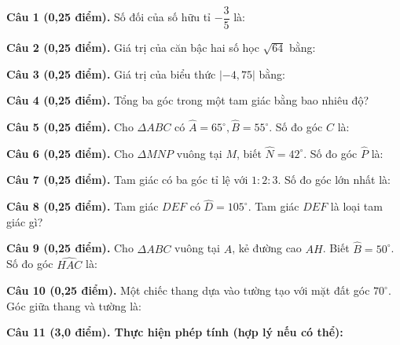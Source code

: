 \documentclass[12pt,a4paper]{article}
\begin{document}
\vspace{1.5mm}
\noindent\textbf{Câu 1 (0,25 điểm).} Số đối của số hữu tỉ $-\dfrac{3}{5}$ là: \par\vspace{2.3mm}
\noindent\textbf{Câu 2 (0,25 điểm).} Giá trị của căn bậc hai số học $\sqrt{64}$ bằng: \par\vspace{2.3mm}
\noindent\textbf{Câu 3 (0,25 điểm).} Giá trị của biểu thức $|-4{,}75|$ bằng: \par\vspace{2.3mm}
\noindent\textbf{Câu 4 (0,25 điểm).} Tổng ba góc trong một tam giác bằng bao nhiêu độ? \par\vspace{2.3mm}
\noindent\textbf{Câu 5 (0,25 điểm).} Cho $\Delta ABC$ có $\widehat{A} = 65^\circ, \widehat{B} = 55^\circ$. Số đo góc $\widehat{C}$ là: \par\vspace{2.3mm}
\noindent\textbf{Câu 6 (0,25 điểm).} Cho $\Delta MNP$ vuông tại $M$, biết $\widehat{N} = 42^\circ$. Số đo góc $\widehat{P}$ là: \par\vspace{2.3mm}
\noindent\textbf{Câu 7 (0,25 điểm).} Tam giác có ba góc tỉ lệ với $1 : 2 : 3$. Số đo góc lớn nhất là: \par\vspace{2.3mm}
\noindent\textbf{Câu 8 (0,25 điểm).} Tam giác $DEF$ có $\widehat{D} = 105^\circ$. Tam giác $DEF$ là loại tam giác gì? \par\vspace{2.3mm}
\noindent\textbf{Câu 9 (0,25 điểm).} Cho $\Delta ABC$ vuông tại $A$, kẻ đường cao $AH$. Biết $\widehat{B} = 50^\circ$. Số đo góc $\widehat{HAC}$ là: \par\vspace{2.3mm}
\noindent\textbf{Câu 10 (0,25 điểm).} Một chiếc thang dựa vào tường tạo với mặt đất góc $70^\circ$. Góc giữa thang và tường là: \par\vspace{2.3mm}
\vspace{0.2mm}
\noindent\textbf{Câu 11 (3,0 điểm). Thực hiện phép tính (hợp lý nếu có thể):}
\vspace{0.8mm}
\end{document}
